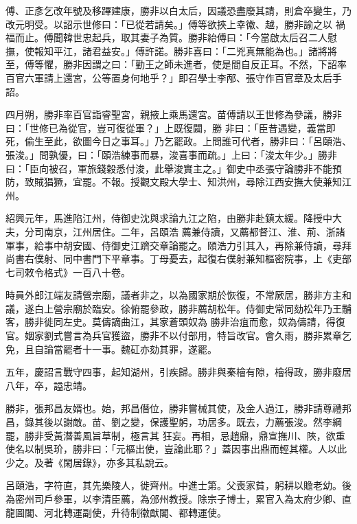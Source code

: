 \begin{pinyinscope}
 傅、正彥乞改年號及移蹕建康，勝非以白太后，因議恐盡廢其請，則倉卒變生，乃改元明受。以詔示世修曰：「已從若請矣。」傅等欲挾上幸徽、越，勝非諭之以
 禍福而止。傅聞韓世忠起兵，取其妻子為質。勝非紿傅曰：「今當啟太后召二人慰撫，使報知平江，諸君益安。」傅許諾。勝非喜曰：「二兇真無能為也。」諸將將至，傅等懼，勝非因謂之曰：「勤王之師未進者，使是間自反正耳。不然，下詔率百官六軍請上還宮，公等置身何地乎？」即召學士李邴、張守作百官章及太后手詔。



 四月朔，勝非率百官詣睿聖宮，親掖上乘馬還宮。苗傅請以王世修為參議，勝非曰：「世修已為從官，豈可復從軍？」上既復闢，勝
 非曰：「臣昔遇變，義當即死，偷生至此，欲圖今日之事耳。」乃乞罷政。上問誰可代者，勝非曰：「呂頤浩、張浚。」問孰優，曰：「頤浩練事而暴，浚喜事而疏。」上曰：「浚太年少。」勝非曰：「臣向被召，軍旅錢穀悉付浚，此舉浚實主之。」御史中丞張守論勝非不能預防，致賊猖獗，宜罷。不報。授觀文殿大學士、知洪州，尋除江西安撫大使兼知江州。



 紹興元年，馬進陷江州，侍御史沈與求論九江之陷，由勝非赴鎮太緩。降授中大夫，分司南京，江州居住。二年，呂頤浩
 薦兼侍讀，又薦都督江、淮、荊、浙諸軍事，給事中胡安國、侍御史江躋交章論罷之。頤浩力引其入，再除兼侍讀，尋拜尚書右僕射、同中書門下平章事。丁母憂去，起復右僕射兼知樞密院事，上《吏部七司敕令格式》一百八十卷。



 時員外郎江端友請營宗廟，議者非之，以為國家期於恢復，不常厥居，勝非方主和議，遂白上營宗廟於臨安。徐俯罷參政，勝非薦胡松年。侍御史常同劾松年乃王黼客，勝非徙同左史。莫儔謫曲江，其家蒼頭奴為
 勝非治疽而愈，奴為儔請，得復官。姻家劉式嘗言為兵官獲盜，勝非不以付部用，特旨改官。會久雨，勝非累章乞免，且自論當罷者十一事。魏矼亦劾其罪，遂罷。



 五年，慶詔言戰守四事，起知湖州，引疾歸。勝非與秦檜有隙，檜得政，勝非廢居八年，卒，謚忠靖。



 勝非，張邦昌友婿也。始，邦昌僭位，勝非嘗械其使，及金人過江，勝非請尊禮邦昌，錄其後以謝敵。苗、劉之變，保護聖躬，功居多。既去，力薦張浚。然李綱罷，勝非受黃潛善風旨草制，極言其
 狂妄。再相，忌趙鼎，鼎宣撫川、陜，欲重使名以制吳玠，勝非曰：「元樞出使，豈論此耶？」蓋因事出鼎而輕其權。人以此少之。及著《閑居錄》，亦多其私說云。



 呂頤浩，字符直，其先樂陵人，徙齊州。中進士第。父喪家貧，躬耕以贍老幼。後為密州司戶參軍，以李清臣薦，為邠州教授。除宗子博士，累官入為太府少卿、直龍圖閣、河北轉運副使，升待制徽猷閣、都轉運使。




\end{pinyinscope}
